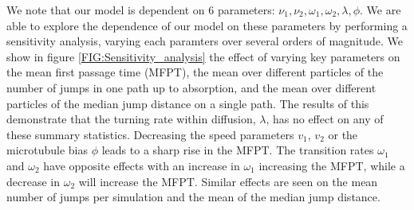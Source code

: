 \documentclass[twocolumn]{biophys}
\begin{document}
We note that our model is dependent on 6 parameters: $\nu_1, \nu_2, \omega_1, \omega_2, \lambda, \phi$. 
We are able to explore the dependence of our model on these parameters by performing a sensitivity analysis, varying each paramters over several orders of magnitude.
We show  in figure \ref{FIG:Sensitivity_analysis} the effect of varying key parameters on the mean first passage time (MFPT), the mean over different particles of the number of jumps in one path up to absorption, and the mean over different particles of the median jump distance on a single path.
The results of this demonstrate that the turning rate within diffusion, $\lambda$, has no effect on any of these summary statistics. Decreasing the speed parameters $v_1$, $v_2$ or the microtubule bias $\phi$ leads to a sharp rise in the MFPT. 
The transition rates $\omega_1$ and $\omega_2$ have opposite effects with an increase in $\omega_1$ increasing the MFPT, while a decrease in $\omega_2$ will increase the MFPT. 
Similar effects are seen on the mean number of jumps per simulation and the mean of the median jump distance.
\end{document}

